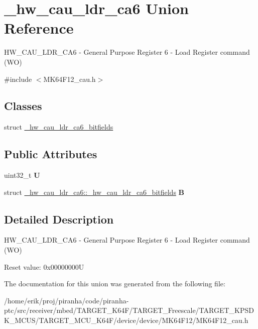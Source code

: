 \hypertarget{union__hw__cau__ldr__ca6}{}\section{\+\_\+hw\+\_\+cau\+\_\+ldr\+\_\+ca6 Union Reference}
\label{union__hw__cau__ldr__ca6}


H\+W\+\_\+\+C\+A\+U\+\_\+\+L\+D\+R\+\_\+\+C\+A6 -\/ General Purpose Register 6 -\/ Load Register command (WO)  




{\ttfamily \#include $<$M\+K64\+F12\+\_\+cau.\+h$>$}

\subsection*{Classes}
\begin{DoxyCompactItemize}
\item 
struct \hyperlink{struct__hw__cau__ldr__ca6_1_1__hw__cau__ldr__ca6__bitfields}{\+\_\+hw\+\_\+cau\+\_\+ldr\+\_\+ca6\+\_\+bitfields}
\end{DoxyCompactItemize}
\subsection*{Public Attributes}
\begin{DoxyCompactItemize}
\item 
uint32\+\_\+t {\bfseries U}\hypertarget{union__hw__cau__ldr__ca6_a4486f2ebf06b48f138705f8fd001718d}{}\label{union__hw__cau__ldr__ca6_a4486f2ebf06b48f138705f8fd001718d}

\item 
struct \hyperlink{struct__hw__cau__ldr__ca6_1_1__hw__cau__ldr__ca6__bitfields}{\+\_\+hw\+\_\+cau\+\_\+ldr\+\_\+ca6\+::\+\_\+hw\+\_\+cau\+\_\+ldr\+\_\+ca6\+\_\+bitfields} {\bfseries B}\hypertarget{union__hw__cau__ldr__ca6_a8d9a80813306e68eaa93a3fb8495e81d}{}\label{union__hw__cau__ldr__ca6_a8d9a80813306e68eaa93a3fb8495e81d}

\end{DoxyCompactItemize}


\subsection{Detailed Description}
H\+W\+\_\+\+C\+A\+U\+\_\+\+L\+D\+R\+\_\+\+C\+A6 -\/ General Purpose Register 6 -\/ Load Register command (WO) 

Reset value\+: 0x00000000U 

The documentation for this union was generated from the following file\+:\begin{DoxyCompactItemize}
\item 
/home/erik/proj/piranha/code/piranha-\/ptc/src/receiver/mbed/\+T\+A\+R\+G\+E\+T\+\_\+\+K64\+F/\+T\+A\+R\+G\+E\+T\+\_\+\+Freescale/\+T\+A\+R\+G\+E\+T\+\_\+\+K\+P\+S\+D\+K\+\_\+\+M\+C\+U\+S/\+T\+A\+R\+G\+E\+T\+\_\+\+M\+C\+U\+\_\+\+K64\+F/device/device/\+M\+K64\+F12/M\+K64\+F12\+\_\+cau.\+h\end{DoxyCompactItemize}
